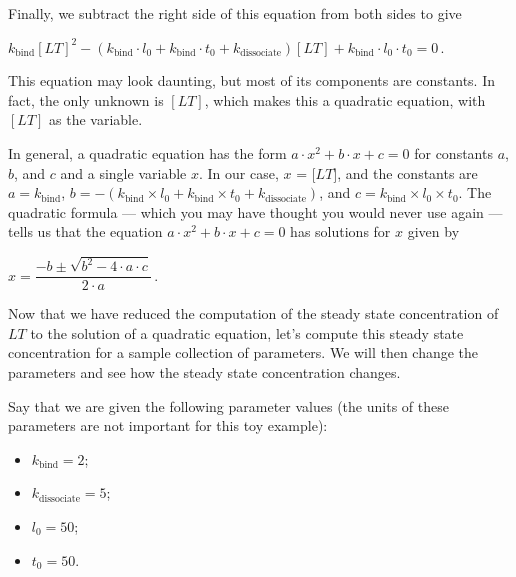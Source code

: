 \noindent Finally, we subtract the right side of this equation from both sides to give

\begin{center}
$k_\text{bind} [LT]^2 - (k_\text{bind} \cdot l_0 + k_\text{bind} \cdot t_0 + k_\text{dissociate}) [LT] + k_\text{bind} \cdot l_0 \cdot t_0 = 0\,.$
\end{center}

\noindent This equation may look daunting, but most of its components are constants. In fact, the only unknown is $[LT]$, which makes this a quadratic equation, with $[LT]$ as the variable.

In general, a quadratic equation has the form $a \cdot x^2 + b \cdot x + c = 0$ for constants $a$, $b$, and $c$ and a single variable $x$. In our case, $x$ = $\text{[}LT\text{]}$, and the constants are $a = k_\text{bind}$, $b = - (k_\text{bind} \times l_0 + k_\text{bind} \times t_0 + k_\text{dissociate})$, and $c = k_\text{bind} \times l_0 \times t_0$. The quadratic formula --- which you may have thought you would never use again --- tells us that the equation $a \cdot x^2 + b \cdot x + c = 0$  has solutions for $x$ given by

\begin{center}
$x = \dfrac{-b \pm \sqrt{b^2 - 4 \cdot a \cdot c}}{2 \cdot a}\,.$
\end{center}

\fudgespace

\begin{qbox}\end{qbox}

Now that we have reduced the computation of the steady state concentration of $LT$ to the solution of a quadratic equation, let's compute this steady state concentration for a sample collection of parameters. We will then change the parameters and see how the steady state concentration changes.

Say that we are given the following parameter values (the units of these parameters are not important for this toy example):
\begin{itemize}
 \item $ k_\text{bind}= 2$;
 \item $k_\text{dissociate} = 5$;
 \item $l_0 = 50$;
 \item $t_0 = 50$.
\end{itemize}

